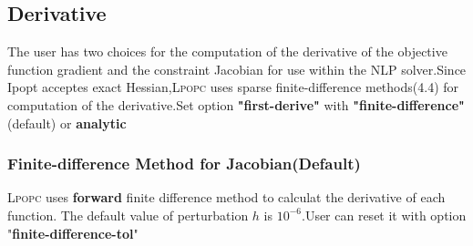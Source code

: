 \documentclass[10pt]{article}
\newcommand{\LPOPC}{\textsc{Lpopc}\xspace}
\begin{document}
	\subsection{Derivative}
	The user has two choices for the computation of the derivative of the objective function gradient and the constraint Jacobian for use within the NLP solver.Since Ipopt acceptes exact Hessian,\LPOPC uses sparse finite-difference methods\cite{Patterson2014}(4.4) for computation of the derivative\cite{Patterson2012}.Set option \textbf{"first-derive"}
	with \textbf{"finite-difference"}(default) or \textbf{analytic}
	\subsubsection{Finite-difference Method for Jacobian(Default)}
	\LPOPC uses \textbf{forward} finite difference method  to calculat the derivative of each function.
	The default value of  perturbation $h$ is $10^{-6}$.User can reset it with option "\textbf{finite-difference-tol}"\\
	
\end{document}
